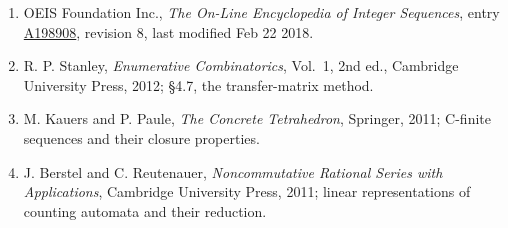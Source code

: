 \documentclass[11pt]{article}
\theoremstyle{definition}
\begin{document}
\begin{enumerate}

\item OEIS Foundation Inc., \emph{The On-Line Encyclopedia of Integer Sequences}, entry \href{https://oeis.org/A198908}{A198908}, revision 8, last modified Feb 22 2018.

\item R. P. Stanley, \emph{Enumerative Combinatorics}, Vol.~1, 2nd ed., Cambridge University Press, 2012; \S4.7, the transfer-matrix method.

\item M. Kauers and P. Paule, \emph{The Concrete Tetrahedron}, Springer, 2011; C-finite sequences and their closure properties.

\item J. Berstel and C. Reutenauer, \emph{Noncommutative Rational Series with Applications}, Cambridge University Press, 2011; linear representations of counting automata and their reduction.

\end{enumerate}
\end{document}
